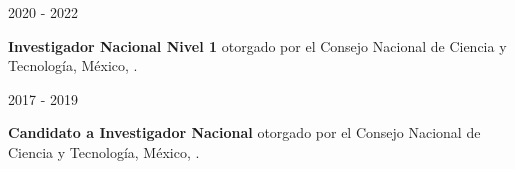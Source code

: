 
\begin{minipage}{1.5 in}
	2020 - 2022\\
\end{minipage}
\begin{minipage}{4.5in}
	\textbf{Investigador Nacional Nivel 1} otorgado por el Consejo Nacional de Ciencia y Tecnología, México, \href{https://www.dropbox.com/s/gasskc02vezprb8/2019_sni_vasquez.pdf?dl=0}{\faFilePdfO}.\\ 
\end{minipage}


\begin{minipage}{1.5 in}
	2017 - 2019\\
\end{minipage}
\begin{minipage}{4.5in}
	\textbf{Candidato a Investigador Nacional} otorgado por el Consejo Nacional de Ciencia y Tecnología, México, \href{https://www.dropbox.com/s/37igr1yucjupmfp/2016_sni_vasquez.pdf?dl=0}{\faFilePdfO}.\\ 
\end{minipage}

